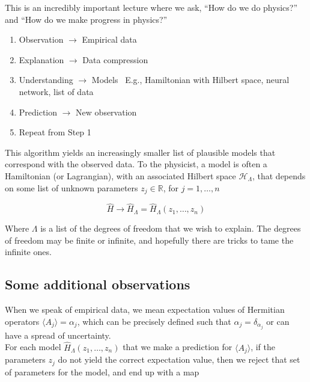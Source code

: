 
\noindent This is an incredibly important lecture where we ask, ``How do we do physics?'' and ``How do we make progress in physics?'' 

\begin{enumerate}
\item Observation
\subitem $\rightarrow$ Empirical data
\item Explanation
\subitem $\rightarrow$ Data compression
\item Understanding
\subitem $\rightarrow$ Models
\subsubitem \, E.g., Hamiltonian with Hilbert space, neural network, list of data
\item Prediction
\subitem $\rightarrow$ New observation
\item Repeat from Step 1
\end{enumerate}

\noindent This algorithm yields an increasingly smaller list of plausible models that correspond with the observed data. To the physicist, a model is often a Hamiltonian (or Lagrangian), with an associated Hilbert space $\mathcal{H}_\Lambda$, that depends on some list of unknown parameters $z_j \in \mathbb{R}$, for $j=1,\dots,n$

\begin{equation}
\hat{H} \rightarrow \hat{H}_\Lambda = \hat{H}_\Lambda  (z_1, \dots, z_n)
\end{equation}

\noindent Where $\Lambda$ is a list of the degrees of freedom that we wish to explain. The degrees of freedom may be finite or infinite, and hopefully there are tricks to tame the infinite ones. \\

\subsection*{Some additional observations}

\noindent When we speak of empirical data, we mean expectation values of Hermitian operators $\langle A_j \rangle = \alpha_j$, which can be precisely defined such that $\alpha_j = \delta_{\alpha_j}$ or can have a spread of uncertainty. \\

\noindent For each model $\hat{H}_\Lambda  (z_1, \dots, z_n)$ that we make a prediction for  $\langle A_j \rangle$, if the parameters $z_j$ do not yield the correct expectation value, then we reject that set of parameters for the model, and end up with a map

